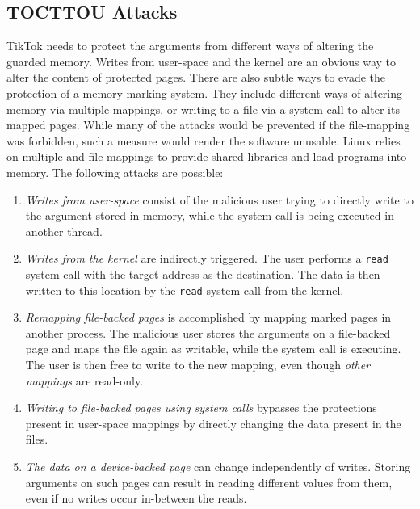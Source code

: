 \documentclass[conference]{IEEEtran}
\newcommand{\pra}[1]{\textcolor{blue}{\textbf{PS:} #1}}
\newcommand{\sysname}{TikTok}
\begin{document}
\subsection{TOCTTOU Attacks}


\sysname{} needs to protect the arguments from different ways of altering the
guarded memory. Writes from user-space and the kernel are an obvious way to
alter the content of protected pages. There are also subtle ways to evade the
protection of a memory-marking system. They include different ways of altering
memory via multiple mappings, or writing to a file via a system call to alter
its mapped pages. While many of the attacks would be prevented if the
file-mapping was forbidden, such a measure would render the software unusable.
Linux relies on multiple and file mappings to provide shared-libraries and load
programs into memory.
The following attacks are possible:
\begin{enumerate}
  \item \label{first} \emph{Writes from user-space} consist of the malicious user trying to directly
  write to the argument stored in memory, while the system-call is being executed
  in another thread. 
  \item \label{second} \emph{Writes from the kernel} are indirectly triggered. The user performs a
  \texttt{read} system-call with the target address as the destination. The data
  is then written to this location by the \texttt{read} system-call from the
  kernel.
  \item \label{third} \emph{Remapping file-backed pages} is accomplished by mapping marked pages in
  another process. The malicious user stores the arguments on a file-backed page
  and maps the file again as writable, while the system call is executing. The
  user is then free to write to the new mapping, even though \emph{other mappings}
  are read-only.  
  \item \label{fourth} \emph{Writing to file-backed pages using system calls} bypasses
  the protections present in user-space mappings by directly changing the data present in
  the files.
  \item \label{fifth} \emph{The data on a device-backed page} can change
  independently of writes. Storing arguments on such pages can result in reading
  different values from them, even if no writes occur in-between the reads.
\end{enumerate}
\end{document}
